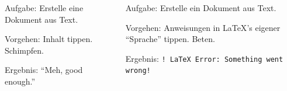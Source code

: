\documentclass["WS\space 16-17\space -\space LaTeX-Kurs\space -\space Praesentation\space -\space 1.tex"]{subfiles}
\begin{document}
\begin{frame}[fragile]
\begin{columns}
    \begin{column}{0.5\textwidth}
      \begin{center}
        \resizebox{0.25\linewidth}{!}{\LaTeX}
      \end{center}
    \end{column}
      
  \end{columns}
  
  \begin{columns}[t]

    \begin{column}{0.5\textwidth}
      \begin{block}{Aufgabe:}
        Erstelle eine Dokument aus Text.
      \end{block}
      \begin{block}{Vorgehen:}
          Inhalt tippen. Schimpfen.
      \end{block}
      \begin{block}{Ergebnis:}
        ``Meh, good enough.''
      \end{block}
    \end{column}

    \begin{column}{0.5\textwidth}
      
      \begin{block}{Aufgabe:}
        Erstelle ein Dokument aus Text.
      \end{block}
      \begin{block}{Vorgehen:}
          Anweisungen in {\LaTeX}'s eigener ``Sprache'' tippen. Beten.
      \end{block}
      \begin{block}{Ergebnis:}
          \alert{\texttt{! LaTeX Error: Something went wrong!}}
      \end{block}
    \end{column}
    
  \end{columns}


\end{frame}
\end{document}
